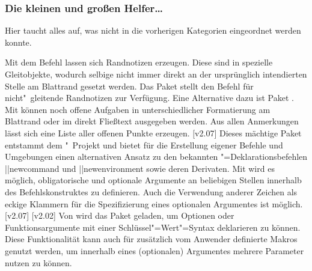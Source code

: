 \subsubsection{Die kleinen und großen Helfer\dots}
%
Hier taucht alles auf, was nicht in die vorherigen Kategorien eingeordnet 
werden konnte.
%
\begin{DeclarePackages}
  Mit dem Befehl  lassen sich Randnotizen erzeugen. Diese sind 
  in  spezielle Gleitobjekte, wodurch selbige nicht immer direkt 
  an der ursprünglich intendierten Stelle am Blattrand gesetzt werden. Das 
  Paket  stellt den Befehl  für 
  nicht"~gleitende Randnotizen zur Verfügung. Eine Alternative dazu ist Paket 
  .
  Mit  können noch offene Aufgaben in unterschiedlicher 
  Formatierung am Blattrand oder im direkt Fließtext ausgegeben werden. Aus 
  allen Anmerkungen lässt sich eine Liste aller offenen Punkte erzeugen.
  [v2.07]
  Dieses mächtige Paket entstammt dem "~Projekt und bietet für 
  die Erstellung eigener Befehle und Umgebungen einen alternativen Ansatz zu 
  den bekannten "=Deklarationsbefehlen \Macro||{newcommand} und 
  \Macro||{newenvironment} sowie deren Derivaten. Mit  wird es 
  möglich, obligatorische und optionale Argumente an beliebigen Stellen 
  innerhalb des Befehlskonstruktes zu definieren. Auch die Verwendung anderer 
  Zeichen als eckige Klammern für die Spezifizierung eines optionalen 
  Argumentes ist möglich.
  [v2.07]
[v2.02]
  Von  wird das Paket  geladen, um Optionen 
  oder Funktionsargumente mit einer Schlüssel"=Wert"=Syntax deklarieren zu 
  können. Diese Funktionalität kann auch für zusätzlich vom Anwender definierte 
  Makros genutzt werden, um innerhalb eines (optionalen) Argumentes mehrere 
  Parameter nutzen zu können.
  

\end{DeclarePackages}
